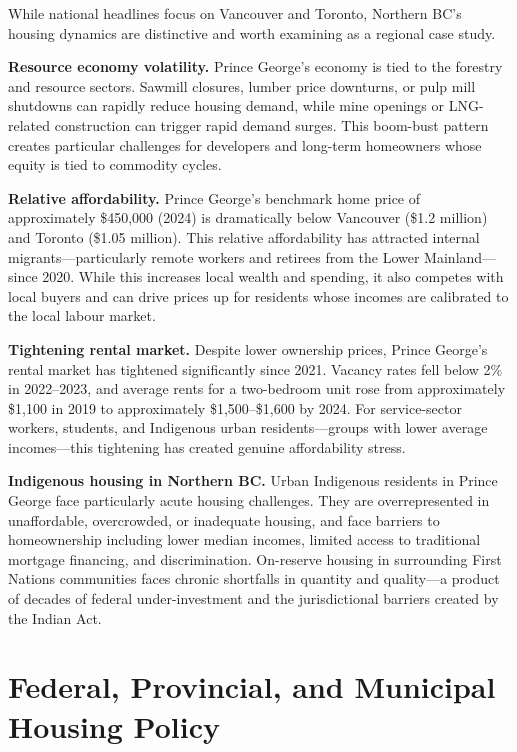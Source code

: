 While national headlines focus on Vancouver and Toronto, Northern BC's housing dynamics are distinctive and worth examining as a regional case study.

\textbf{Resource economy volatility.} Prince George's economy is tied to the forestry and resource sectors. Sawmill closures, lumber price downturns, or pulp mill shutdowns can rapidly reduce housing demand, while mine openings or LNG-related construction can trigger rapid demand surges. This boom-bust pattern creates particular challenges for developers and long-term homeowners whose equity is tied to commodity cycles.

\textbf{Relative affordability.} Prince George's benchmark home price of approximately \$450,000 (2024) is dramatically below Vancouver (\$1.2 million) and Toronto (\$1.05 million). This relative affordability has attracted internal migrants---particularly remote workers and retirees from the Lower Mainland---since 2020. While this increases local wealth and spending, it also competes with local buyers and can drive prices up for residents whose incomes are calibrated to the local labour market.

\textbf{Tightening rental market.} Despite lower ownership prices, Prince George's rental market has tightened significantly since 2021. Vacancy rates fell below 2\% in 2022--2023, and average rents for a two-bedroom unit rose from approximately \$1,100 in 2019 to approximately \$1,500--\$1,600 by 2024. For service-sector workers, students, and Indigenous urban residents---groups with lower average incomes---this tightening has created genuine affordability stress.

\textbf{Indigenous housing in Northern BC.} Urban Indigenous residents in Prince George face particularly acute housing challenges. They are overrepresented in unaffordable, overcrowded, or inadequate housing, and face barriers to homeownership including lower median incomes, limited access to traditional mortgage financing, and discrimination. On-reserve housing in surrounding First Nations communities faces chronic shortfalls in quantity and quality---a product of decades of federal under-investment and the jurisdictional barriers created by the Indian Act.

\section{Federal, Provincial, and Municipal Housing Policy}

